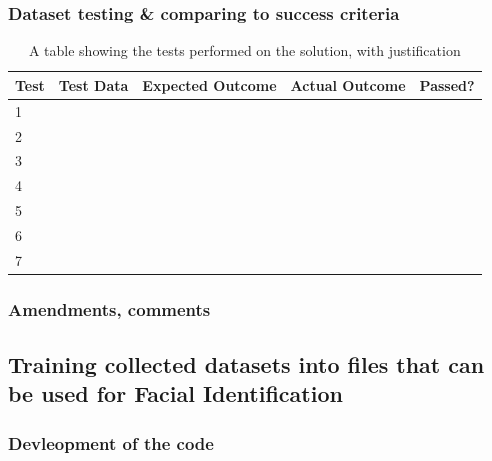\documentclass[9pt]{article}
\begin{document}
\subsubsection{Dataset testing \& comparing to success criteria}
\begin{table}[H]
	\centering
	\begin{tabularx}{\textwidth}{lXXXl}
		Test & \textbf{Test Data} & \textbf{Expected Outcome} & \textbf{Actual Outcome} & \textbf{Passed?} \\
		\midrule
		1    &                    &                           &                         &                  \\
		2    &                    &                           &                         &                  \\
		3    &                    &                           &                         &                  \\
		4    &                    &                           &                         &                  \\
		5    &                    &                           &                         &                  \\
		6    &                    &                           &                         &                  \\
		7    &                    &                           &                         &                  \\
		\bottomrule
	\end{tabularx}
	\caption{A table showing the tests performed on the solution, with justification}
	\label{tab_testingDesignSolution}
\end{table}




\subsubsection{Amendments, comments}




\newpage
\subsection{Training collected datasets into files that can be used for Facial Identification}
\subsubsection{Devleopment of the code}
\end{document}
